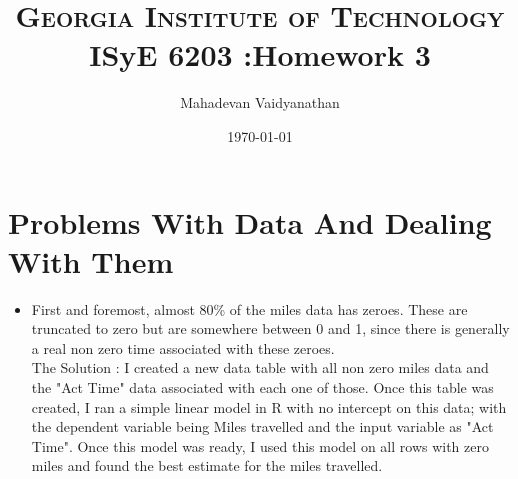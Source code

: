 \documentclass[paper=a4, fontsize=11pt]{scrartcl} %
\title{
\normalfont \normalsize 
\textsc{Georgia Institute of Technology} \\ [25pt] %
\huge ISyE 6203 :Homework 3 \\ %
}
\author{Mahadevan Vaidyanathan} %
\date{\normalsize\today} %
\begin{document}
\maketitle
\section{Problems With Data And Dealing With Them}

\begin{itemize}
\item First and foremost, almost 80\% of the miles data has zeroes. These are truncated to zero but are somewhere between 0 and 1, since there is generally a real non zero time associated with these zeroes.
\\The Solution : I created a new data table with all non zero miles data and the "Act Time" data associated with each one of those. Once this table was created, I ran a simple linear model in R with no intercept on this data; with the dependent variable being Miles travelled and the input variable as "Act Time". Once this model was ready, I used this model on all rows with zero miles and found the best estimate for the miles travelled. 
\end{itemize}
\begin{lstlisting}[language=R]

\end{lstlisting}
\end{document}

